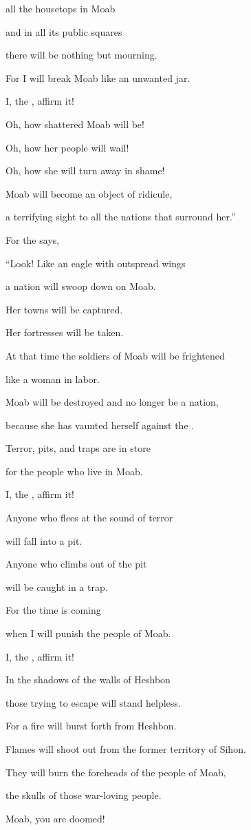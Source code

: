 {all
the housetops
in Moab
\par }{\Q and in all
its public squares
\par }{\Q there will be nothing but mourning.
\par }{\Q For
I will break
Moab
like an unwanted
jar.
\par }{\Q I, the
{}, affirm it!
\par }{\Q {}Oh, how
shattered
Moab
will be!
\par }{\Q Oh, how her people will wail!
\par }{\Q Oh, how
she will turn away
in shame!
\par }{\Q Moab
will become an object of ridicule,
\par }{\Q a terrifying sight
to all
the nations that surround her.”
\par }{\Q {}For
the {}
says,
\par }{\Q “Look! Like an eagle
with outspread
wings
\par }{\Q a nation will swoop down on Moab.
\par }{\Q {}Her towns will be captured.
\par }{\Q Her fortresses
will be
taken.
\par }{\Q At that time
the soldiers
of Moab
will be frightened
\par }{\Q like a woman
in labor.
\par }{\Q {}Moab
will be destroyed
and no longer be a nation,
\par }{\Q because
she has vaunted
herself against
the {}.
\par }{\Q {}Terror,
pits,
and traps
are in store
\par }{\Q for the people who live
in Moab.
\par }{\Q I, the
{}, affirm it!
\par }{\Q {}Anyone who flees
at the sound of terror
\par }{\Q will fall
into
a pit.
\par }{\Q Anyone who climbs out of the pit
\par }{\Q will be caught
in a trap.
\par }{\Q For
the time
is coming
\par }{\Q when I will punish
the people of Moab.
\par }{\Q I, the
{}, affirm it!
\par }{\Q {}In the shadows
of the walls of Heshbon
\par }{\Q those trying to escape
will stand
helpless.
\par }{\Q For
a fire
will burst forth
from Heshbon.
\par }{\Q Flames
will shoot out from
the former territory of Sihon.
\par }{\Q They will burn
the foreheads
of the people
of Moab,
\par }{\Q the skulls
of those war-loving
people.
\par }{\Q {}Moab,
you are doomed!

}
